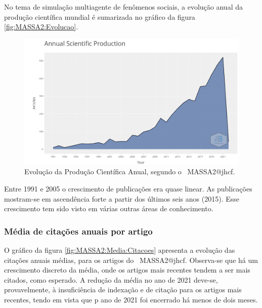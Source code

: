 No tema de simulação multiagente de fenômenos sociais, a evolução anual da produção científica mundial é sumarizada no gráfico da figura \ref{fig:MASSA2:Evolucao}.

\begin{figure}
    \centering
    \includegraphics[width=1\textwidth]{experiments/jhcf/PesqBibliogr/SimulacaoMultiagente/WoS-20220203/Descritiva/MASSA2-Annual-Scientific-Production.png}
    \caption{Evolução da Produção Científica Anual, segundo o \dataset\ MASSA2@jhcf.}
    \label{fig:MASSA2:Annual-Scientific-Production}
\end{figure}

Entre 1991 e 2005 o crescimento de publicações era quase linear. As publicações mostram-se em ascendência forte a partir dos últimos seis anos (2015). Esse crescimento tem sido visto em várias outras áreas de conhecimento.

\subsubsection{Média de citações anuais por artigo}

O gráfico da figura \ref{fig:MASSA2:Media:Citacoes} apresenta a evolução das citações anuais médias, para os artigos do \dataset\ MASSA2@jhcf. Observa-se que há um crescimento discreto da média, onde os artigos mais recentes tendem a ser mais citados, como esperado. A redução da média no ano de 2021 deve-se, provavelmente, à insuficiência de indexação e de citação para os artigos mais recentes, tendo em vista que p ano de 2021 foi encerrado há menos de dois meses. 

